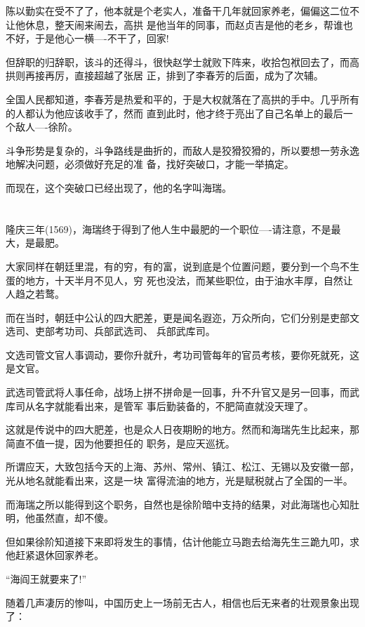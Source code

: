 \documentclass[11pt,a4paper,onecolumn]{article}
\begin{document}
陈以勤实在受不了了，他本就是个老实人，准备干几年就回家养老，偏偏这二位不让他休息，整天闹来闹去，高拱
是他当年的同事，而赵贞吉是他的老乡，帮谁也不好，于是他心一横----不干了，回家!

但辞职的归辞职，该斗的还得斗，很快赵学士就败下阵来，收拾包袱回去了，而高拱则再接再厉，直接超越了张居
正，排到了李春芳的后面，成为了次辅。

全国人民都知道，李春芳是热爱和平的，于是大权就落在了高拱的手中。几乎所有的人都认为他应该收手了，然而
直到此时，他才终于亮出了自己名单上的最后一个敌人----徐阶。

斗争形势是复杂的，斗争路线是曲折的，而敌人是狡猾狡猾的，所以要想一劳永逸地解决问题，必须做好充足的准
备，找好突破口，才能一举搞定。

而现在，这个突破口已经出现了，他的名字叫海瑞。

\section[\thesection]{}

隆庆三年(1569)，海瑞终于得到了他人生中最肥的一个职位----请注意，不是最大，是最肥。

大家同样在朝廷里混，有的穷，有的富，说到底是个位置问题，要分到一个鸟不生蛋的地方，十天半月不见人，穷
死也没法，而某些职位，由于油水丰厚，自然让人趋之若鹜。

而在当时，朝廷中公认的四大肥差，更是闻名遐迩，万众所向，它们分别是吏部文选司、吏部考功司、兵部武选司、
兵部武库司。

文选司管文官人事调动，要你升就升，考功司管每年的官员考核，要你死就死，这是文官。

武选司管武将人事任命，战场上拼不拼命是一回事，升不升官又是另一回事，而武库司从名字就能看出来，是管军
事后勤装备的，不肥简直就没天理了。

这就是传说中的四大肥差，也是众人日夜期盼的地方。然而和海瑞先生比起来，那简直不值一提，因为他要担任的
职务，是应天巡抚。

所谓应天，大致包括今天的上海、苏州、常州、镇江、松江、无锡以及安徽一部，光从地名就能看出来，这是一块
富得流油的地方，光是赋税就占了全国的一半。

而海瑞之所以能得到这个职务，自然也是徐阶暗中支持的结果，对此海瑞也心知肚明，他虽然直，却不傻。

但如果徐阶知道接下来即将发生的事情，估计他能立马跑去给海先生三跪九叩，求他赶紧退休回家养老。

``海阎王就要来了!''

随着几声凄厉的惨叫，中国历史上一场前无古人，相信也后无来者的壮观景象出现了：
\end{document}
